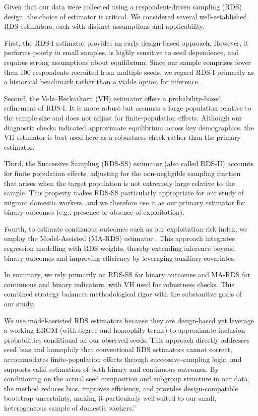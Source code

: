 \documentclass[
  12pt,
  letterpaper,
  DIV=11,
  numbers=noendperiod]{scrartcl}
\theoremstyle{plain}
\theoremstyle{definition}
\begin{document}
Given that our data were collected using a respondent-driven sampling
(RDS) design, the choice of estimator is critical. We considered several
well-established RDS estimators, each with distinct assumptions and
applicability.

First, the RDS-I estimator \textcite{salg04-sampling} provides an early
design-based approach. However, it performs poorly in small samples, is
highly sensitive to seed dependence, and requires strong assumptions
about equilibrium. Since our sample comprises fewer than 100 respondents
recruited from multiple seeds, we regard RDS-I primarily as a historical
benchmark rather than a viable option for inference.

Second, the Volz--Heckathorn (VH) estimator
\textcite{volz08-probability} offers a probability-based refinement of
RDS-I. It is more robust but assumes a large population relative to the
sample size and does not adjust for finite-population effects. Although
our diagnostic checks indicated approximate equilibrium across key
demographics, the VH estimator is best used here as a robustness check
rather than the primary estimator.

Third, the Successive Sampling (RDS-SS) estimator (also called RDS-II)
\textcite{gile11-improved} accounts for finite population effects,
adjusting for the non-negligible sampling fraction that arises when the
target population is not extremely large relative to the sample. This
property makes RDS-SS particularly appropriate for our study of migrant
domestic workers, and we therefore use it as our primary estimator for
binary outcomes (e.g., presence or absence of exploitation).

Fourth, to estimate continuous outcomes such as our exploitation risk
index, we employ the Model-Assisted (MA-RDS) estimator
\textcite{gile15-network}. This approach integrates regression modelling
with RDS weights, thereby extending inference beyond binary outcomes and
improving efficiency by leveraging auxiliary covariates.

In summary, we rely primarily on RDS-SS for binary outcomes and MA-RDS
for continuous and binary indicators, with VH used for robustness
checks. This combined strategy balances methodological rigor with the
substantive goals of our study.

We use model-assisted RDS estimators \autocite{gile15-network} because
they are design-based yet leverage a working ERGM (with degree and
homophily terms) to approximate inclusion probabilities conditional on
our observed seeds. This approach directly addresses seed bias and
homophily that conventional RDS estimators cannot correct, accommodates
finite-population effects through successive-sampling logic, and
supports valid estimation of both binary and continuous outcomes. By
conditioning on the actual seed composition and subgroup structure in
our data, the method reduces bias, improves efficiency, and provides
design-compatible bootstrap uncertainty, making it particularly
well-suited to our small, heterogeneous sample of domestic workers.''
\end{document}
